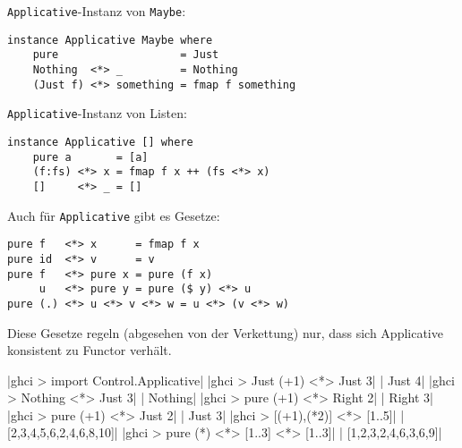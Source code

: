 \documentclass{beamer}
\begin{document}
\begin{frame}[fragile]
\texttt{Applicative}-Instanz von \texttt{Maybe}:
\begin{verbatim}
instance Applicative Maybe where
    pure                   = Just
    Nothing  <*> _         = Nothing
    (Just f) <*> something = fmap f something
\end{verbatim}
\begin{comment}
\pause
Applicative-Instanz von Either:
\begin{verbatim}
instance Applicative Either where
    pure                    = Right
    (Right f) <*> something = fmap f something
    (Left e)  <*> _         = Left e
\end{verbatim}
\end{comment}
\pause
\bigskip

\texttt{Applicative}-Instanz von Listen:
\begin{verbatim}
instance Applicative [] where
    pure a       = [a]
    (f:fs) <*> x = fmap f x ++ (fs <*> x)
    []     <*> _ = []
\end{verbatim}
\end{frame}

\begin{frame}[fragile]
Auch für \texttt{Applicative} gibt es Gesetze:
\smallskip

\begin{verbatim}
pure f   <*> x      = fmap f x
pure id  <*> v      = v
pure f   <*> pure x = pure (f x)
     u   <*> pure y = pure ($ y) <*> u
pure (.) <*> u <*> v <*> w = u <*> (v <*> w)
\end{verbatim}
\bigskip

Diese Gesetze regeln (abgesehen von der Verkettung) nur, dass sich Applicative konsistent zu Functor verhält.
\end{frame}


\begin{frame}[fragile]
|ghci > import Control.Applicative|
|ghci > Just (+1) <*> Just 3|
\pause
{}|       Just 4|
|ghci > Nothing <*> Just 3|
\pause
{}|       Nothing|
|ghci > pure (+1) <*> Right 2|
\pause
{}|       Right 3|
|ghci > pure (+1) <*> Just 2|
\pause
{}|       Just 3|
|ghci > [(+1),(*2)] <*> [1..5]|
\pause
{}|       [2,3,4,5,6,2,4,6,8,10]|
|ghci > pure (*) <*> [1..3] <*> [1..3]|
\pause
{}|       [1,2,3,2,4,6,3,6,9]|
\end{frame}
\end{document}
